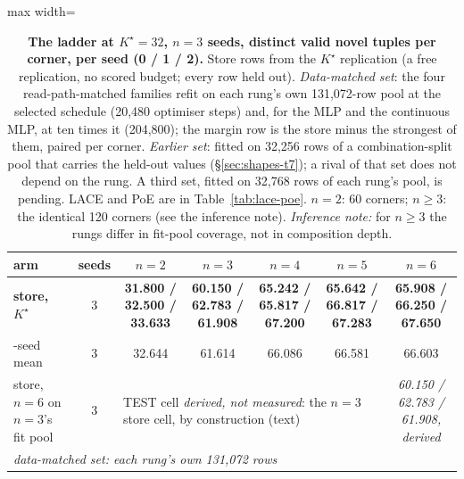 \documentclass{article} %
\newcommand{\Kstar}{\ensuremath{K^{\star}}}
\begin{document}
\begin{table}[t]
\centering\small
\caption{\textbf{The ladder at $\Kstar=32$, $n=3$ seeds, distinct valid novel tuples per %
corner, per seed (0 / 1 / 2).} Store rows from the $\Kstar$ replication (a free replication,
no scored budget; every row held out). \emph{Data-matched set}: the four read-path-matched families %
refit on each rung's own 131,072-row pool at the selected schedule (20,480 optimiser steps) and, for %
the MLP and the continuous MLP, at ten times it (204,800); the margin row is the store minus the %
strongest of them, paired per corner. \emph{Earlier set}: fitted on 32,256 rows of a %
combination-split pool that carries the held-out values (\S\ref{sec:shapes-t7}); a rival of that set
does not depend on the rung. A third set, fitted on 32,768 rows of each rung's pool, is pending. LACE %
and PoE are in Table~\ref{tab:lace-poe}. $n=2$: 60 corners; $n\ge3$: the identical %
120 corners (see the inference note). \emph{Inference note:} for $n\ge3$ the rungs differ in %
fit-pool coverage, not in composition depth.}
\label{tab:ladder}
\setlength{\tabcolsep}{2.6pt}
\begin{adjustbox}{max width=\linewidth}\begin{tabular}{lcccccc}
\toprule
arm & seeds & $n=2$ & $n=3$ & $n=4$ & $n=5$ & $n=6$ \\
\midrule
\textbf{store, $\Kstar$} & 3 & \textbf{31.800 / 32.500 / 33.633} & \textbf{60.150 / 62.783 / 61.908} & \textbf{65.242 / 65.817 / 67.200} & \textbf{65.642 / 66.817 / 67.283} & \textbf{65.908 / 66.250 / 67.650} \\
\quad 3-seed mean & 3 & 32.644 & 61.614 & 66.086 & 66.581 & 66.603 \\
store, $n=6$ on $n=3$'s fit pool & 3 & \multicolumn{4}{l}{TEST cell \emph{derived, not measured}: the $n=3$ store cell, by construction (text)} & \emph{60.150 / 62.783 / 61.908, derived} \\ %
\midrule
\multicolumn{7}{l}{\emph{data-matched set: each rung's own 131,072 rows}} \\ %

\end{tabular}
\end{adjustbox}
\end{table}
\end{document}
